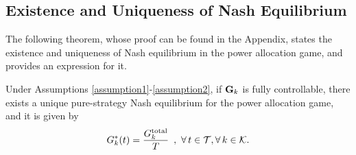 \subsection{Existence and Uniqueness of Nash Equilibrium} 
%
The following theorem, whose proof can be found in the Appendix, states the existence and uniqueness of Nash equilibrium in the power allocation game, and provides an expression for it.
\begin{theorem}
Under Assumptions \ref{assumption1}-\ref{assumption2}, if ${\bf G}_k$ is fully controllable, there exists a unique pure-strategy Nash equilibrium for the power allocation game,
and it is given by \begin{equation} G^*_k(t)=\frac{G^{{\rm total}}_k}{T} \,\,\,,\,\, \forall \,t\in {\cal T}, \forall \, k\in {\cal K}.\label{NE}\end{equation}\label{allocation}\end{theorem}

